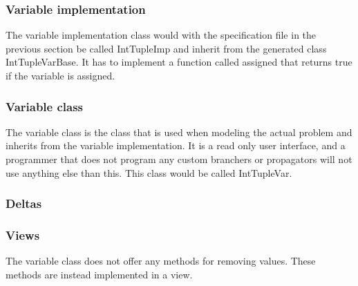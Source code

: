\documentclass[a4paper,11pt]{article}
\begin{document}
\subsubsection{Variable implementation}
The variable implementation class would with the specification file in the previous section be called IntTupleImp and inherit from the generated class IntTupleVarBase. It has to implement a function called assigned that returns true if the variable is assigned.
\subsubsection{Variable class}
The variable class is the class that is used when modeling the actual problem and inherits from the variable implementation. It is a read only user interface, and a programmer that does not program any custom branchers or propagators will not use anything else than this. This class would be called IntTupleVar.

\subsubsection{Deltas}
\subsubsection{Views}
The variable class does not offer any methods for removing values. These methods are instead implemented in a view.
\end{document}
